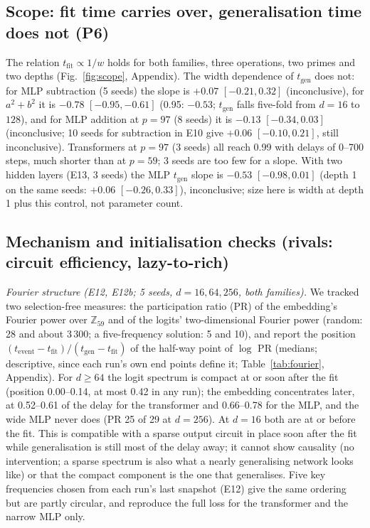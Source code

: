 \documentclass{article}
\begin{document}
\subsection{Scope: fit time carries over, generalisation time does not (P6)}
The relation $t_{\mathrm{fit}}\propto1/w$ holds for both families, three operations, two primes and two depths (Fig.~\ref{fig:scope}, Appendix). The width dependence of $t_{\mathrm{gen}}$ does not: for MLP subtraction (5 seeds) the slope is $+0.07$ $[-0.21,0.32]$ (inconclusive), for $a^2+b^2$ it is $-0.78$ $[-0.95,-0.61]$ (0.95: $-0.53$; $t_{\mathrm{gen}}$ falls five-fold from $d=16$ to $128$), and for MLP addition at $p=97$ (8 seeds) it is $-0.13$ $[-0.34,0.03]$ (inconclusive; 10 seeds for subtraction in E10 give $+0.06$ $[-0.10,0.21]$, still inconclusive). Transformers at $p=97$ (3 seeds) all reach 0.99 with delays of 0--700 steps, much shorter than at $p=59$; 3 seeds are too few for a slope. With two hidden layers (E13, 3 seeds) the MLP $t_{\mathrm{gen}}$ slope is $-0.53$ $[-0.98,0.01]$ (depth 1 on the same seeds: $+0.06$ $[-0.26,0.33]$), inconclusive; size here is width at depth 1 plus this control, not parameter count.



\subsection{Mechanism and initialisation checks (rivals: circuit efficiency, lazy-to-rich)}
\emph{Fourier structure (E12, E12b; 5 seeds, $d=16,64,256$, both families).} We tracked two selection-free measures: the participation ratio (PR) of the embedding's Fourier power over $\mathbb Z_{59}$ and of the logits' two-dimensional Fourier power (random: 28 and about 3\,300; a five-frequency solution: 5 and 10), and report the position $(t_{\mathrm{event}}-t_{\mathrm{fit}})/(t_{\mathrm{gen}}-t_{\mathrm{fit}})$ of the half-way point of $\log$ PR (medians; descriptive, since each run's own end points define it; Table~\ref{tab:fourier}, Appendix). For $d\ge64$ the logit spectrum is compact at or soon after the fit (position 0.00--0.14, at most 0.42 in any run); the embedding concentrates later, at 0.52--0.61 of the delay for the transformer and 0.66--0.78 for the MLP, and the wide MLP never does (PR 25 of 29 at $d=256$). At $d=16$ both are at or before the fit. This is compatible with a sparse output circuit in place soon after the fit while generalisation is still most of the delay away; it cannot show causality (no intervention; a sparse spectrum is also what a nearly generalising network looks like) or that the compact component is the one that generalises. Five key frequencies chosen from each run's last snapshot (E12) give the same ordering but are partly circular, and reproduce the full loss for the transformer and the narrow MLP only.
\end{document}
